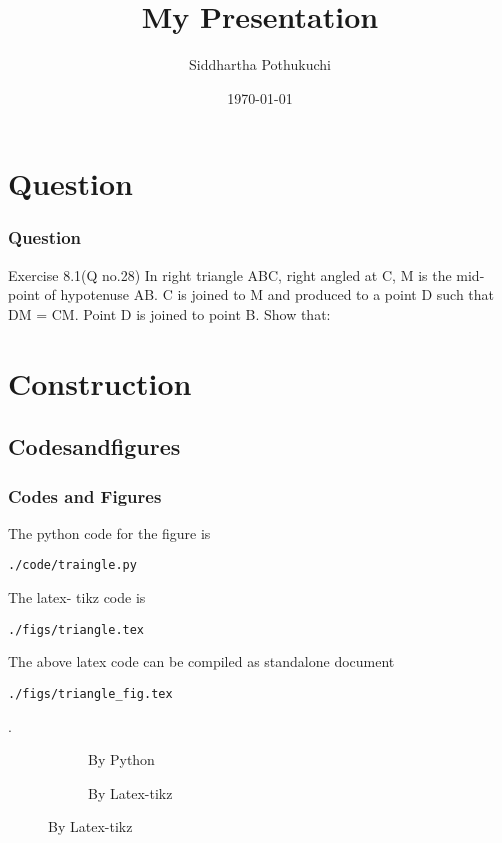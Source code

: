 \documentclass{beamer}
\title{My Presentation}
\author{Siddhartha Pothukuchi}
\institute{Indian Institute of Technology, Bhilai.}
\date{\today}
\begin{document}
\begin{frame}
\titlepage
\end{frame}
\section{Question}
\begin{frame}
\frametitle{Question}
\begin{block}{Exercise 8.1(Q no.28)}
In right triangle ABC, right angled at C, M is
the mid-point of hypotenuse AB. C is joined to
M and produced to a point D such that DM =
CM. Point D is joined to point B. Show that:
\newline
\hyperlink{a}{}
\newline
\hyperlink{b}{}
\newline
\hyperlink{c}{}
\newline
\hyperlink{d}{}

\end{block}
\end{frame}

\section{\textbf{Construction}}
\subsection*{Codesandfigures}
\begin{frame}[fragile]
\frametitle{Codes and Figures}
\tiny
\begin{flushleft}
The python code for the figure is
\begin{lstlisting}
./code/traingle.py
\end{lstlisting}
The latex- tikz code is
\begin{lstlisting}
./figs/triangle.tex
\end{lstlisting}
The above latex code can be compiled as standalone document
\begin{lstlisting} 
./figs/triangle_fig.tex
\end{lstlisting}
\end{flushleft}.
\begin{figure}
\begin{flushleft}
\begin{subfigure}{0.2\textwidth}
\caption{\tiny By Python}
\end{subfigure}
%
\begin{subfigure}{0.65\textwidth}
\begin{flushright}
%
\caption{\tiny By Latex-tikz}
\end{flushright}
\end{subfigure}
\end{flushleft}
%
\end{figure}
\end{frame}
\end{document}
